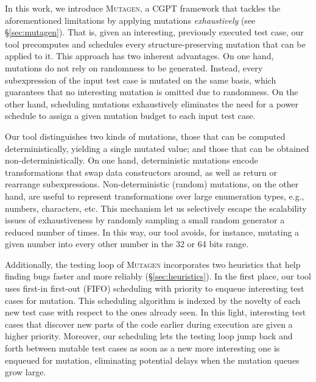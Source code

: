 \documentclass[sigconf, anonymous, review]{acmart}
\newcommand{\fuzzchick}{\textit{FuzzChick}\xspace}
\newcommand{\mutagen}{\textsc{Mutagen}\xspace}
\begin{document}
In this work, we introduce \mutagen, a CGPT framework that tackles the
aforementioned limitations by applying mutations \emph{exhaustively} (see
\S \ref{sec:mutagen}).
%
%
%
%
%
%
That is, given an interesting, previously executed test case, our tool
precomputes and schedules every structure-preserving mutation that can be
applied to it.
%
This approach has two inherent advantages. %
%
On one hand, mutations do not rely on randomness to be generated.
%
Instead, every subexpression of the input test case is mutated on the same
basis, which guarantees that no interesting mutation is omitted due to
randomness.
%
%
On the other hand, scheduling mutations exhaustively eliminates the need for a
power schedule to assign a given mutation budget to each input test case.


%
Our tool distinguishes two kinds of mutations, those that can be computed
deterministically, yielding a single mutated value; and those that can be
obtained non-deterministically.
%
On one hand, deterministic mutations encode transformations that swap data
constructors around, as well as return or rearrange subexpressions.
%
Non-deterministic (random) mutations, on the other hand, are useful to represent
transformations over large enumeration types, e.g., numbers, characters, etc.
%
This mechanism let us selectively escape the scalability issues of
exhaustiveness by randomly sampling a small random generator a reduced number of
times.
%
In this way, our tool avoids, for instance, mutating a given number into every
other number in the 32 or 64 bits range.


Additionally, the testing loop of \mutagen incorporates two heuristics that help
finding bugs faster and more reliably (\S \ref{sec:heuristics}).
%
In the first place, our tool uses first-in first-out (FIFO) scheduling with
priority to enqueue interesting test cases for mutation.
%
This scheduling algorithm is indexed by the novelty of each new test case with
respect to the ones already seen.
%
In this light, interesting test cases that discover new parts of the code
earlier during execution are given a higher priority.
%
Moreover, our scheduling lets the testing loop jump back and forth between
mutable test cases as soon as a new more interesting one is enqueued for
mutation, eliminating potential delays when the mutation queues grow large.
\end{document}
